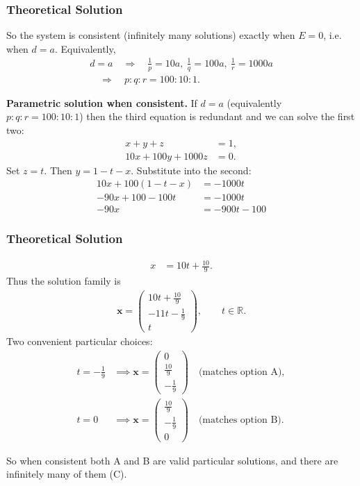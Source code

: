 \documentclass{beamer}
\theoremstyle{remark}
\newcommand{\myvec}[1]{\ensuremath{\begin{pmatrix}#1\end{pmatrix}}}
\let\vec\mathbf
\numberwithin{equation}{section}
\begin{document}
\begin{frame}
\frametitle{Theoretical Solution}
So the system is consistent (infinitely many solutions) exactly when \(E=0\), i.e. when \(d=a\). Equivalently,
\begin{align}
d=a \quad\Longrightarrow\quad \frac{1}{p}=10a,\ \frac{1}{q}=100a,\ \frac{1}{r}=1000a \\
\quad\Longrightarrow\quad p:q:r = 100:10:1.
\end{align}

\noindent\textbf{Parametric solution when consistent.} If \(d=a\) (equivalently  \(p:q:r=100:10:1\)) then the third equation is redundant and we can solve the first two:
\begin{align}
x+y+z &= 1, \\
10x+100y+1000z &= 0.
\end{align}
Set \(z=t\). Then \(y=1-t-x\). Substitute into the second:
\begin{align}
10x + 100(1-t-x) &= -1000t
\\
-90x +100 -100t &= -1000t
\\
-90x &= -900t -100
\end{align}

\end{frame}

\begin{frame}
\frametitle{Theoretical Solution}

\begin{align}
x &= 10t + \frac{10}{9}.
\end{align}
Thus the solution family is
\begin{align}
\vec{x} = \myvec{10t+\frac{10}{9}\\ -11t-\frac{1}{9}\\ t},\qquad t\in\mathbb{R}.
\end{align}
Two convenient particular choices:
\begin{align}
t=-\frac{1}{9} &\implies \vec{x}=\myvec{0\\\frac{10}{9}\\ -\frac{1}{9}}\quad\text{(matches option A)},\\
t=0 &\implies \vec{x}=\myvec{\frac{10}{9}\\ -\frac{1}{9}\\ 0}\quad\text{(matches option B)}.
\end{align}

So when consistent both A and B are valid particular solutions, and there are infinitely many of them (C).

\end{frame}
\end{document}
